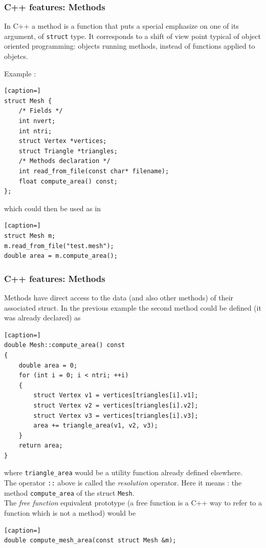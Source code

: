 \documentclass[8pt]{beamer}
\begin{document}
\begin{frame}[containsverbatim]
\frametitle{C++ features: Methods}

In C++ a method is a function that puts a special emphasize on one of its
argument, of {\tt struct} type. It corresponds to a shift of view point typical
of object oriented programming: objects running methods, instead of functions
applied to objetcs.

\medskip

Example :\\[3pt]

\begin{lstlisting}[caption=]
struct Mesh {
	/* Fields */
	int nvert;
	int ntri;
	struct Vertex *vertices;
	struct Triangle *triangles;
	/* Methods declaration */
	int read_from_file(const char* filename);
	float compute_area() const; 
};
\end{lstlisting}

which could then be used as in 

\begin{lstlisting}[caption=]
struct Mesh m;
m.read_from_file("test.mesh");
double area = m.compute_area();
\end{lstlisting}

\end{frame}

\begin{frame}[containsverbatim]
\frametitle{C++ features: Methods}

Methods have direct access to the data (and also other methods) of their associated struct.
In the previous example the second method could be defined (it was already declared) as

\begin{lstlisting}[caption=]
double Mesh::compute_area() const
{
	double area = 0;
	for (int i = 0; i < ntri; ++i)
	{
		struct Vertex v1 = vertices[triangles[i].v1];
		struct Vertex v2 = vertices[triangles[i].v2];
		struct Vertex v3 = vertices[triangles[i].v3];
		area += triangle_area(v1, v2, v3);
	}
	return area;
}
\end{lstlisting}
where {\tt triangle\_area} would be a utility function already defined
elsewhere.\\[3pt]

The operator {\tt ::} above is called the {\it resolution} operator. Here it means : the
method {\tt compute\_area} of the struct {\tt Mesh}.\\[3pt]

The {\it free function} equivalent prototype (a free function is a C++ way to refer to a function
which is not a method) would be

\begin{lstlisting}[caption=]
double compute_mesh_area(const struct Mesh &m);
\end{lstlisting}


\end{frame}
\end{document}
